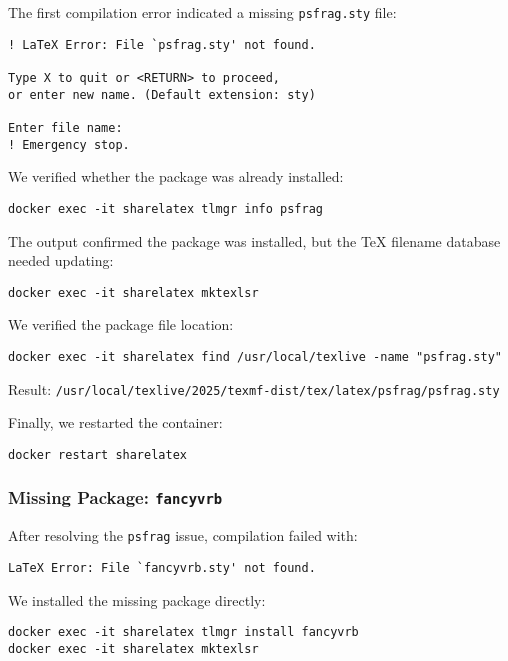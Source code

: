 The first compilation error indicated a missing \verb|psfrag.sty| file:

\begin{verbatim}
! LaTeX Error: File `psfrag.sty' not found.

Type X to quit or <RETURN> to proceed,
or enter new name. (Default extension: sty)

Enter file name: 
! Emergency stop.
\end{verbatim}

We verified whether the package was already installed:

\begin{verbatim}
docker exec -it sharelatex tlmgr info psfrag
\end{verbatim}

The output confirmed the package was installed, but the \TeX{} filename database needed updating:

\begin{verbatim}
docker exec -it sharelatex mktexlsr
\end{verbatim}

We verified the package file location:

\begin{verbatim}
docker exec -it sharelatex find /usr/local/texlive -name "psfrag.sty"
\end{verbatim}

Result: \texttt{/usr/local/texlive/2025/texmf-dist/tex/latex/psfrag/psfrag.sty}

Finally, we restarted the container:

\begin{verbatim}
docker restart sharelatex
\end{verbatim}

\subsubsection{Missing Package: \texttt{fancyvrb}}

After resolving the \verb|psfrag| issue, compilation failed with:

\begin{verbatim}
LaTeX Error: File `fancyvrb.sty' not found.
\end{verbatim}

We installed the missing package directly:

\begin{verbatim}
docker exec -it sharelatex tlmgr install fancyvrb
docker exec -it sharelatex mktexlsr
\end{verbatim}

